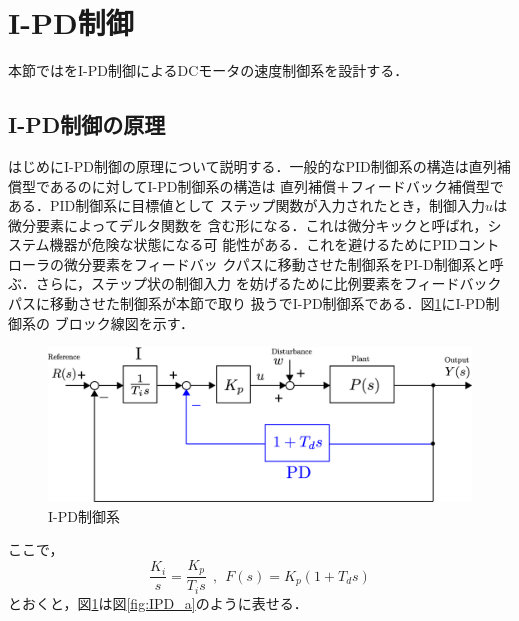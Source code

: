 \documentclass[a4paper,12pt]{jarticle}
\begin{document}
\section{I-PD制御}
本節ではをI-PD制御によるDCモータの速度制御系を設計する．

\subsection{I-PD制御の原理}
はじめにI-PD制御の原理について説明する．一般的なPID制御系の構造は直列補
償型であるのに対してI-PD制御系の構造は
直列補償＋フィードバック補償型である．PID制御系に目標値として
ステップ関数が入力されたとき，制御入力$u$は微分要素によってデルタ関数を
含む形になる．これは微分キックと呼ばれ，システム機器が危険な状態になる可
能性がある．これを避けるためにPIDコントローラの微分要素をフィードバッ
クパスに移動させた制御系をPI-D制御系と呼ぶ．さらに，ステップ状の制御入力
を妨げるために比例要素をフィードバックパスに移動させた制御系が本節で取り
扱うでI-PD制御系である．図\ref{fig:IPD_b}にI-PD制御系の
ブロック線図を示す．
%
\begin{figure}[bp]
 \begin{center}
  \includegraphics[width = 150mm]{fig/IPD_b.eps}
 \end{center}
 \caption{I-PD制御系}
 \label{fig:IPD_b}
\end{figure}
%
ここで，
%
\begin{equation}
 \frac{K_i}{s} = \frac{K_p}{T_is} \ \ , \ \ F(s) = K_p(1+T_d s)
\end{equation}
%
とおくと，図\ref{fig:IPD_b}は図\ref{fig:IPD_a}のように表せる．
%
\end{document}
